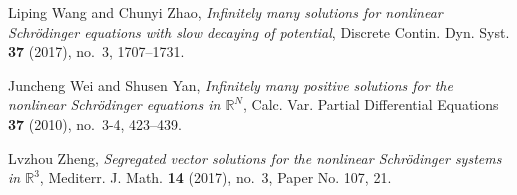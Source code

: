 \documentclass{amsart}
\theoremstyle{definition}
\theoremstyle{remark}
\numberwithin{equation}{section}
\begin{document}
\begin{thebibliography}{10}
Liping Wang and Chunyi Zhao, \emph{Infinitely many solutions for nonlinear
  {S}chr\"{o}dinger equations with slow decaying of potential}, Discrete
  Contin. Dyn. Syst. \textbf{37} (2017), no.~3, 1707--1731. 

Juncheng Wei and Shusen Yan, \emph{Infinitely many positive solutions for the
  nonlinear {S}chr\"{o}dinger equations in {$\mathbb R^N$}}, Calc. Var. Partial
  Differential Equations \textbf{37} (2010), no.~3-4, 423--439. 

Lvzhou Zheng, \emph{Segregated vector solutions for the nonlinear
  {S}chr\"{o}dinger systems in {$\mathbb{R}^3$}}, Mediterr. J. Math. \textbf{14}
  (2017), no.~3, Paper No. 107, 21. 


\end{thebibliography}
\end{document}
